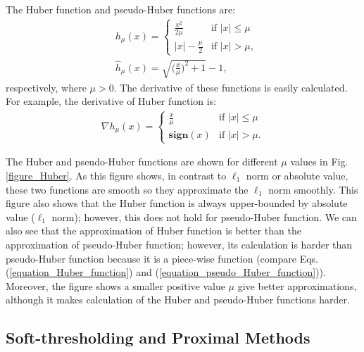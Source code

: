 \documentclass[lang=cn,10pt]{gorgeousnbook}
\numberwithin{equation}{section}%
\numberwithin{figure}{section}%
\begin{document}
\begin{definition}
The Huber function and pseudo-Huber functions are:
\begin{align}
& h_\mu(x) =
\left\{
    \begin{array}{ll}
        \frac{x^2}{2 \mu} & \mbox{if } |x| \leq \mu \\
        |x| - \frac{\mu}{2} & \mbox{if } |x| > \mu,
    \end{array}
\right. 
\label{equation_Huber_function}\\
& \widehat{h}_{\mu}(x) = \sqrt{\Big(\frac{x}{\mu}\Big)^2 + 1} - 1, \label{equation_pseudo_Huber_function}
\end{align}
respectively, where $\mu > 0$.
The derivative of these functions is easily calculated. For example, the derivative of Huber function is:
\begin{align*}
\nabla h_\mu(x) =
\left\{
    \begin{array}{ll}
        \frac{x}{\mu} & \mbox{if } |x| \leq \mu \\
        \textbf{sign}(x) & \mbox{if } |x| > \mu.
    \end{array}
\right. 
\end{align*}
\end{definition}

The Huber and pseudo-Huber functions are shown for different $\mu$ values in Fig. \ref{figure_Huber}.
As this figure shows, in contrast to $\ell_1$ norm or absolute value, these two functions are smooth so they approximate the $\ell_1$ norm smoothly. 
This figure also shows that the Huber function is always upper-bounded by absolute value ($\ell_1$ norm); however, this does not hold for pseudo-Huber function. 
We can also see that the approximation of Huber function is better than the approximation of pseudo-Huber function; however, its calculation is harder than pseudo-Huber function because it is a piece-wise function (compare Eqs. (\ref{equation_Huber_function}) and (\ref{equation_pseudo_Huber_function})). 
Moreover, the figure shows a smaller positive value $\mu$ give better approximations, although it makes calculation of the Huber and pseudo-Huber functions harder. 

\subsection{Soft-thresholding and Proximal Methods}
\end{document}
